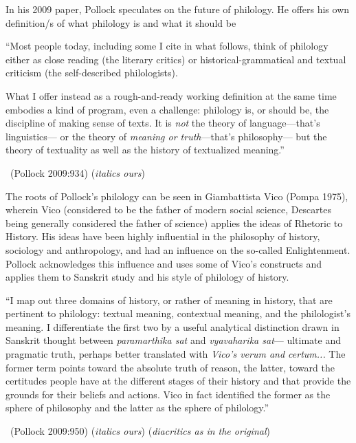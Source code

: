 In his 2009 paper, Pollock speculates on the future of philology. He offers his own definition/s of what philology is and what it should be

\begin{myquote}
“Most people today, including some I cite in what follows, think of philology either as close reading (the literary critics) or historical-grammatical and textual criticism (the self-described philologists).
\end{myquote}

\begin{myquote}
What I offer instead as a rough-and-ready working definition at the same time embodies a kind of program, even a challenge: philology is, or should be, the discipline of making sense of texts. It is \textit{not} the theory of language—that’s linguistics— or the theory of \textit{meaning or truth}—that’s philosophy— but the theory of textuality as well as the history of textualized meaning.”

~\hfill (Pollock 2009:934) (\textit{italics ours})
\end{myquote}

The roots of Pollock’s philology can be seen in Giambattista Vico (Pompa 1975), wherein Vico (considered to be the father of modern social science, Descartes being generally considered the father of science) applies the ideas of Rhetoric to History. His ideas have been highly influential in the philosophy of history, sociology and anthropology, and had an influence on the so-called Enlightenment. Pollock acknowledges this influence and uses some of Vico’s constructs and applies them to Sanskrit study and his style of philology of history.

\begin{myquote}
“I map out three domains of history, or rather of meaning in history, that are pertinent to philology: textual meaning, contextual meaning, and the philologist’s meaning. I differentiate the first two by a useful analytical distinction drawn in Sanskrit thought between \textit{paramarthika sat} and \textit{vyavaharika sat}— ultimate and pragmatic truth, perhaps better translated with \textit{Vico’s verum and certum...} The former term points toward the absolute truth of reason, the latter, toward the certitudes people have at the different stages of their history and that provide the grounds for their beliefs and actions. Vico in fact identified the former as the sphere of philosophy and the latter as the sphere of philology.”

~\hfill (Pollock 2009:950) (\textit{italics ours}) (\textit{diacritics as in the original})
\end{myquote}

